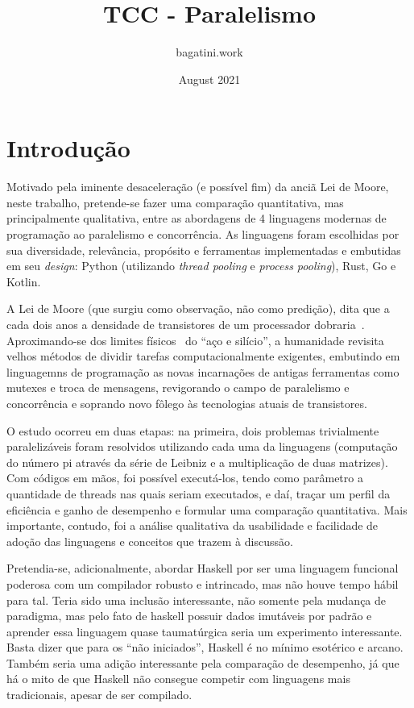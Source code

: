 \documentclass{article}
\title{TCC - Paralelismo}
\author{bagatini.work }
\date{August 2021}
\begin{document}
\maketitle

\section{Introdução}

Motivado pela iminente desaceleração (e possível fim) da anciã Lei de Moore, neste trabalho, pretende-se fazer uma comparação quantitativa, mas principalmente qualitativa, entre as abordagens de 4 linguagens modernas de programação ao paralelismo e concorrência. As linguagens foram escolhidas por sua diversidade, relevância, propósito e ferramentas implementadas e embutidas em seu \emph{design}: Python (utilizando \emph{thread pooling} e \emph{process pooling}), Rust, Go e Kotlin.

A Lei de Moore (que surgiu como observação, não como predição), dita que a cada dois anos a densidade de transistores de um processador dobraria~\cite{moore1965cramming}. Aproximando-se dos limites físicos~\cite{seabaugh2013tunneling} do ``aço e silício'', a humanidade revisita velhos métodos de dividir tarefas computacionalmente exigentes, embutindo em linguagemns de programação as novas incarnações de antigas ferramentas como mutexes e troca de mensagens, revigorando o campo de paralelismo e concorrência e soprando novo fôlego às tecnologias atuais de transistores.

O estudo ocorreu em duas etapas: na primeira, dois problemas trivialmente paralelizáveis foram resolvidos utilizando cada uma da linguagens (computação do número pi através da série de Leibniz e a multiplicação de duas matrizes). Com códigos em mãos, foi possível executá-los, tendo como parâmetro a quantidade de threads nas quais seriam executados, e daí, traçar um perfil da eficiência e ganho de desempenho e formular uma comparação quantitativa. Mais importante, contudo, foi a análise qualitativa da usabilidade e facilidade de adoção das linguagens e conceitos que trazem à discussão.

Pretendia-se, adicionalmente, abordar Haskell por ser uma linguagem funcional poderosa com um compilador robusto e intrincado, mas não houve tempo hábil para tal. Teria sido uma inclusão interessante, não somente pela mudança de paradigma, mas pelo fato de haskell possuir dados imutáveis por padrão e aprender essa linguagem quase taumatúrgica seria um experimento interessante. Basta dizer que para os ``não iniciados'', Haskell é no mínimo esotérico e arcano. Também seria uma adição interessante pela comparação de desempenho, já que há o mito de que Haskell não consegue competir com linguagens mais tradicionais, apesar de ser compilado.
\end{document}
